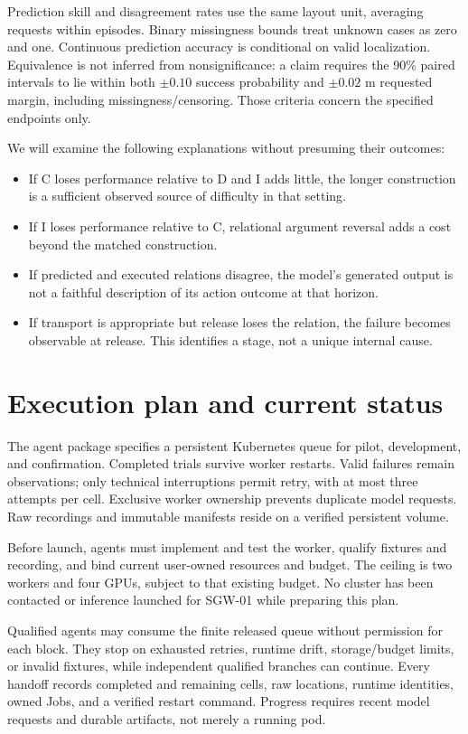 \documentclass[11pt]{article}
\begin{document}
Prediction skill and disagreement rates use the same layout unit, averaging requests within episodes. Binary missingness bounds treat unknown cases as zero and one. Continuous prediction accuracy is conditional on valid localization. Equivalence is not inferred from nonsignificance: a claim requires the 90\% paired intervals to lie within both $\pm0.10$ success probability and $\pm0.02$ m requested margin, including missingness/censoring. Those criteria concern the specified endpoints only.

We will examine the following explanations without presuming their outcomes:
\begin{itemize}
\item If C loses performance relative to D and I adds little, the longer construction is a sufficient observed source of difficulty in that setting.
\item If I loses performance relative to C, relational argument reversal adds a cost beyond the matched construction.
\item If predicted and executed relations disagree, the model's generated output is not a faithful description of its action outcome at that horizon.
\item If transport is appropriate but release loses the relation, the failure becomes observable at release. This identifies a stage, not a unique internal cause.
\end{itemize}

\section{Execution plan and current status}
The agent package specifies a persistent Kubernetes queue for pilot, development, and confirmation. Completed trials survive worker restarts. Valid failures remain observations; only technical interruptions permit retry, with at most three attempts per cell. Exclusive worker ownership prevents duplicate model requests. Raw recordings and immutable manifests reside on a verified persistent volume.

Before launch, agents must implement and test the worker, qualify fixtures and recording, and bind current user-owned resources and budget. The ceiling is two workers and four GPUs, subject to that existing budget. No cluster has been contacted or inference launched for SGW-01 while preparing this plan.

Qualified agents may consume the finite released queue without permission for each block. They stop on exhausted retries, runtime drift, storage/budget limits, or invalid fixtures, while independent qualified branches can continue. Every handoff records completed and remaining cells, raw locations, runtime identities, owned Jobs, and a verified restart command. Progress requires recent model requests and durable artifacts, not merely a running pod.
\end{document}
